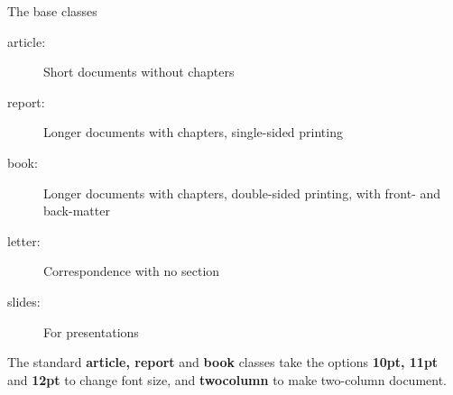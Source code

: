 \documentclass[a4paper, 12pt]{article}
\begin{document}
The base classes

\begin{description}
    \item[article:] Short documents without chapters
    \item[report:] Longer documents with chapters, single-sided printing
    \item[book:] Longer documents with chapters, double-sided printing, with front- and back-matter
    \item[letter:] Correspondence with no section
    \item[slides:] For presentations
\end{description}

The standard \textbf{article, report} and \textbf{book} classes take the options \textbf{10pt, 11pt} and \textbf{12pt}
to change font size, and \textbf{twocolumn} to make two-column document.
\end{document}
